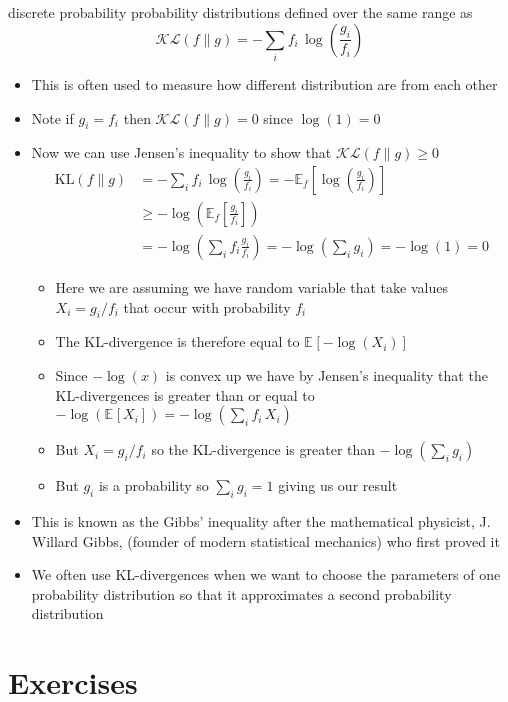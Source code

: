 \documentclass[11pt]{article}
\newcommand{\av}[2][]{\mathbb{E}_{#1\!}\left[ #2 \right]}
\newcommand{\logg}[1]{\log\!\left( #1 \right)}
\begin{document}
\begin{itemize}
\begin{itemize}
discrete probability probability distributions defined over the
same range as
$$ \mathcal{KL}(f \| g) = - \sum_i f_i \,  \logg{\frac{g_i}{f_i}} $$
\begin{itemize}
\item This is often used to measure how different distribution are
from each other
\item Note if \(g_i=f_i\) then \(\mathcal{KL}(f \| g) =0\) since \(\log(1)=0\)
\item Now we can use Jensen's inequality to show that
\(\mathcal{KL}(f \| g) \geq 0\)
\begin{align*}
\mathrm{KL}(f \| g) &= - \sum_i f_i \, \logg{\frac{g_i}{f_i}}
=- \av[f]{\logg{\frac{g_i}{f_i}}}\\
&\geq -\logg{\av[f]{\frac{g_i}{f_i}}} \\
&= - \logg{\sum_i f_i \frac{g_i}{f_i}} = -\logg{\sum_i g_i} = -\log(1)  = 0
\end{align*}
\begin{itemize}
\item Here we are assuming we have random variable that take
values \(X_i=g_i/f_i\) that occur with probability \(f_i\)
\item The KL-divergence is therefore equal to \(\av{-\log(X_i)}\)
\item Since \(-\log(x)\) is convex up we have by Jensen's
inequality that the KL-divergences is greater than or equal
to \(-\logg{\av{X_i}} = -\logg{\sum_i f_i\,X_i}\)
\item But \(X_i=g_i/f_i\) so the KL-divergence is greater than
\(-\logg{\sum_i g_i}\)
\item But \(g_i\) is a probability so \(\sum_i g_i=1\) giving us our result
\end{itemize}
\item This is known as the Gibbs' inequality after the mathematical
physicist, J. Willard Gibbs, (founder of modern statistical
mechanics) who first proved it
\item We often use KL-divergences when we want to choose the
parameters of one probability distribution so that it
approximates a second probability distribution
\end{itemize}
\end{itemize}
\end{itemize}

\section{Exercises}
\label{sec:orga59cdf1}
\end{document}
